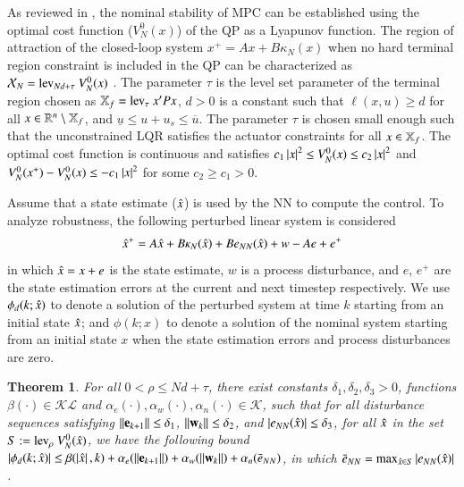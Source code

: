 \documentclass[preprint,5p, twocolumn, authoryear]{elsarticle}
\newtheorem{thm}{Theorem}
\begin{document}
As reviewed in \cite*{mayne:rawlings:rao:scokaert:2000}, the nominal stability
of MPC can be established using the optimal cost function ($V_N^0(x)$) of the QP
as a Lyapunov function. The region of attraction of the closed-loop system $x^+
= Ax + B\kappa_N(x)$ when no hard terminal region constraint is included in the
QP can be characterized as $\mathcal{X}_N = \textnormal{lev}_{Nd + \tau} \
V_N^0(x)$ \citep*{limon:alamo:salas:camacho:2006}. The parameter $\tau$ is the
level set parameter of the terminal region chosen as $\mathbb{X}_f =
\textnormal{lev}_{\tau} \ x'Px$, $d > 0$ is a constant such that $\ell(x, u)
\geq d$ for all $x \in \mathbb{R}^n \setminus \mathbb{X}_f$, and $\underline{u} \leq u+u_s
\leq \overline{u}$. The parameter $\tau$ is chosen small enough such that the
unconstrained LQR satisfies the actuator constraints for all $x \in \mathbb{X}_f$. The
optimal cost function is continuous and satisfies $c_1\left| x \right|^2 \leq V_N^0(x)
\leq c_2\left| x \right|^2$ and $V_N^0(x^+) - V_N^0(x) \leq -c_1\left| x \right|^2$ for some
$c_2 \geq c_1 > 0$.

Assume that a state estimate ($\hat{x}$) is used by the NN to compute the control.
To analyze robustness, the following perturbed linear system is considered
\begin{align} \label{eq:perturbed_sys}
    \hat{x}^+ = A\hat{x} + B\kappa_N(\hat{x}) + Be_{NN}(\hat{x}) + w - Ae + e^+
\end{align}
in which $\hat{x} = x + e$ is the state estimate, $w$ is a process disturbance,
and $e$, $e^+$ are the state estimation errors at the current and next timestep
respectively. We use $\phi_d(k;\hat{x})$ to denote a solution of the perturbed
system  at time $k$ starting from an initial state $\hat{x}$; and $\phi(k;x)$ to
denote a solution  of the nominal system starting  from an initial state $x$
when the state estimation errors and process disturbances are zero.

\begin{thm} \label{thm:nnrobustness} For all $ 0 < \rho \leq Nd + \tau$, there
exist constants $\delta_1, \delta_2, \delta_3 > 0$, functions $\beta(\cdot) \in
\mathcal{K} \mathcal{L}$ and $\alpha_e(\cdot) , \alpha_w(\cdot),
\alpha_{n}(\cdot) \in \mathcal{K}$, such that for all disturbance sequences
satisfying $\left| \left| \mathbf{e}_{k+1} \right| \right| \leq \delta_1$,
$\left| \left| \mathbf{w}_k \right| \right| \leq \delta_2$, and $\left| e_{NN}(\hat{x}) \right| \leq
\delta_3$, for all $\hat{x}$ in the set $S := \textnormal{lev}_{\rho} \
V_N^0(\hat{x})$, we have the following bound $\left| \phi_d(k; \hat{x}) \right| \leq
\beta(\left| \hat{x} \right|, k) + \alpha_e(\left| \left| \mathbf{e}_{k+1} \right| \right|) +
\alpha_w(\left| \left| \mathbf{w}_k \right| \right|) + \alpha_n(\bar{e}_{NN})$, in which
$\bar{e}_{NN} = \textnormal{max}_{\hat{x} \in S} \left| e_{NN}(\hat{x}) \right|$.
\end{thm}
\end{document}
